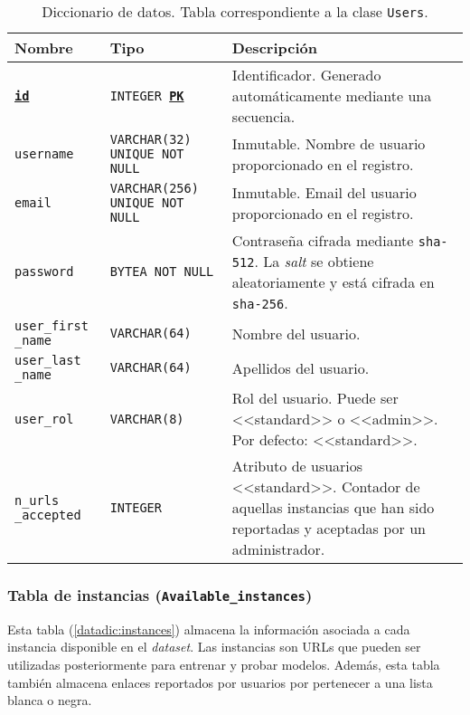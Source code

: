 \begin{table}
	\small
	\begin{centering}
		\begin{tabular}{@{}p{6em} p{7em} p{20em}@{}}
			\toprule
			\textbf{Nombre} & \textbf{Tipo} & \textbf{Descripción}\\
			\midrule
			\texttt{\textbf{\underline{id}}} & \texttt{INTEGER \textbf{\underline{PK}}} & Identificador. Generado automáticamente mediante una secuencia. \\
			\texttt{username} &  \texttt{VARCHAR(32) UNIQUE NOT NULL} & Inmutable. Nombre de usuario proporcionado en el registro.\\
			\texttt{email} & \texttt{VARCHAR(256) UNIQUE NOT NULL} & Inmutable. Email del usuario proporcionado en el registro.\\
			\texttt{password} &  \texttt{BYTEA NOT NULL} & Contraseña cifrada mediante \texttt{sha-512}. La \textit{salt} se obtiene aleatoriamente y está cifrada en \texttt{sha-256}.\\
			\texttt{user\_first \_name} & \texttt{VARCHAR(64)} & Nombre del usuario.\\
			\texttt{user\_last \_name} & \texttt{VARCHAR(64)} & Apellidos del usuario. \\
			\texttt{user\_rol} & \texttt{VARCHAR(8)} & Rol del usuario. Puede ser <<standard>> o <<admin>>. Por defecto: <<standard>>. \\
			\texttt{n\_urls \_accepted} & \texttt{INTEGER} &    Atributo de usuarios <<standard>>. Contador de aquellas instancias que han sido reportadas y aceptadas por un administrador. \\
			\bottomrule
		\end{tabular}
	\end{centering}
	\caption[Diccionario de datos: Users]{Diccionario de datos. Tabla correspondiente a la clase \texttt{Users}.}
	\label{datadic:users}
\end{table}

\subsubsection{Tabla de instancias (\texttt{Available\_instances})}

Esta tabla (\ref{datadic:instances}) almacena la información asociada a cada instancia disponible en el \textit{dataset}. Las instancias son URLs que pueden ser utilizadas posteriormente para entrenar y probar modelos. Además, esta tabla también almacena enlaces reportados por usuarios por pertenecer a una lista blanca o negra.

